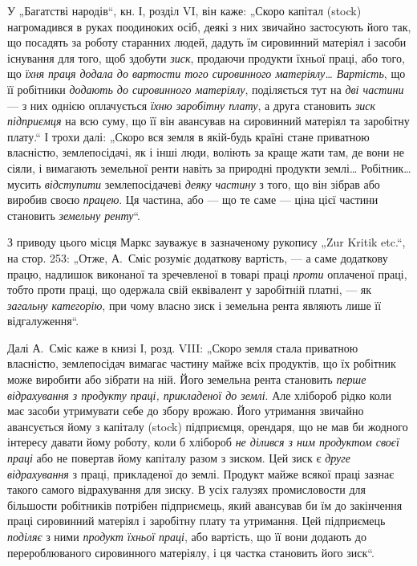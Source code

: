 У „Багатстві народів“, кн. І, розділ VI, він каже: „Скоро капітал
(stock) нагромадився в руках поодиноких осіб, деякі з них звичайно застосують
його так, що посадять за роботу старанних людей, дадуть їм
сировинний матеріял і засоби існування для того, щоб здобути \emph{зиск},
продаючи продукти їхньої праці, або того, що \emph{їхня праця додала до
вартости того сировинного матеріялу\dots{} Вартість}, що її робітники
\emph{додають до сировинного матеріялу}, поділяється тут на \emph{дві частини} —
з них однією оплачується \emph{їхню заробітну плату}, а друга становить
\emph{зиск підприємця} на всю суму, що її він авансував на сировинний
матеріял та заробітну плату.“ І трохи далі: „Скоро вся земля в якій-будь
країні стане приватною власністю, землепосідачі, як і інші люди,
воліють за краще жати там, де вони не сіяли, і вимагають земельної
ренти навіть за природні продукти землі\dots{} Робітник\dots{} мусить \emph{відступити}
землепосідачеві \emph{деяку частину} з того, що він зібрав або виробив
своєю \emph{працею}. Ця частина, або — що те саме — ціна цієї частини становить
\emph{земельну ренту}“.

З приводу цього місця Маркс зауважує в зазначеному рукопису
„Zur Kritik etc.“, на стор. 253: „Отже, А.~Сміс розуміє додаткову вартість,
— а саме додаткову працю, надлишок виконаної та зречевленої в
товарі праці \emph{проти} оплаченої праці, тобто проти праці, що одержала
свій еквівалент у заробітній платні, — як \emph{загальну категорію}, при чому
власно зиск і земельна рента являють лише її відгалуження“.

Далі А.~Сміс каже в книзі І, розд. VIII: „Скоро земля стала приватною
власністю, землепосідач вимагає частину майже всіх продуктів, що
їх робітник може виробити або зібрати на ній. Його земельна рента
становить \emph{перше відрахування з продукту праці, прикладеної до землі}.
Але хлібороб рідко коли має засоби утримувати себе до збору врожаю.
Його утримання звичайно авансується йому з капіталу (stock) підприємця,
орендаря, що не мав би жодного інтересу давати йому роботу, коли б
хлібороб \emph{не ділився з ним продуктом своєї праці} або не повертав йому
капіталу разом з зиском. Цей зиск є \emph{друге відрахування} з праці, прикладеної
до землі. Продукт майже всякої праці зазнає такого самого
відрахування для зиску. В усіх галузях промисловости для більшости робітників
потрібен підприємець, який авансував би їм до закінчення праці
сировинний матеріял і заробітну плату та утримання. Цей підприємець
\emph{поділяє} з ними \emph{продукт їхньої праці}, або вартість, що її вони додають
до перероблюваного сировинного матеріялу, і ця частка становить його
зиск“.

